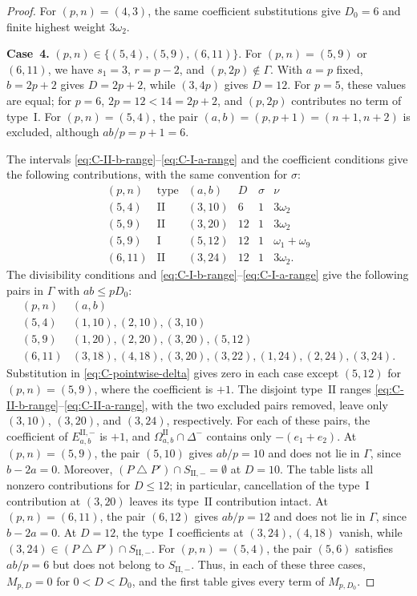 \documentclass[11pt,a4paper]{amsart}
\theoremstyle{plain}
\numberwithin{equation}{section}
\newenvironment{pf}{\begin{proof}}{\end{proof}}
\begin{document}
\begin{pf}
	For \((p,n)=(4,3)\), the same coefficient substitutions give
	\(D_0=6\) and finite highest weight \(3\omega_2\).
	
	\smallskip
	
	\noindent\textbf{Case~4.} \((p,n)\in\{(5,4),(5,9),(6,11)\}\).
	For \((p,n)=(5,9)\) or \((6,11)\), we have \(s_1=3\),
	\(r=p-2\), and \((p,2p)\notin\Gamma\). With \(a=p\) fixed,
	\(b=2p+2\) gives \(D=2p+2\), while \((3,4p)\) gives \(D=12\).
	For \(p=5\), these values are equal; for \(p=6\),
	\(2p=12<14=2p+2\), and \((p,2p)\) contributes no
	term of type~\(\mathrm I\). For \((p,n)=(5,4)\), the pair
	\((a,b)=(p,p+1)=(n+1,n+2)\) is excluded, although
	\(ab/p=p+1=6\).
	
	The intervals \eqref{eq:C-II-b-range}--\eqref{eq:C-I-a-range}
	and the coefficient conditions give the following contributions,
	with the same convention for \(\sigma\):
	\[
	\begin{array}{c|c|c|c|c|l}
		(p,n)&\text{type}&(a,b)&D&\sigma&\nu\\ \hline
		(5,4)&\mathrm{II}&(3,10)&6&1&3\omega_2\\
		(5,9)&\mathrm{II}&(3,20)&12&1&3\omega_2\\
		(5,9)&\mathrm I&(5,12)&12&1&\omega_1+\omega_9\\
		(6,11)&\mathrm{II}&(3,24)&12&1&3\omega_2.
	\end{array}
	\]
	The divisibility conditions and
	\eqref{eq:C-I-b-range}--\eqref{eq:C-I-a-range} give the following
	pairs in \(\Gamma\) with \(ab\le pD_0\):
	\[
	\begin{array}{c|l}
		(p,n)&(a,b)\\ \hline
		(5,4)&(1,10),(2,10),(3,10)\\
		(5,9)&(1,20),(2,20),(3,20),(5,12)\\
		(6,11)&(3,18),(4,18),(3,20),(3,22),(1,24),(2,24),(3,24).
	\end{array}
	\]
	Substitution in \eqref{eq:C-pointwise-delta} gives zero in each
	case except \((5,12)\) for \((p,n)=(5,9)\), where the coefficient
	is \(+1\). The disjoint type~\(\mathrm{II}\) ranges
	\eqref{eq:C-II-b-range}--\eqref{eq:C-II-a-range}, with the two
	excluded pairs removed, leave only \((3,10)\), \((3,20)\), and
	\((3,24)\), respectively. For each of these pairs, the coefficient of
	\(E_{a,b}^{\mathrm{II},-}\) is \(+1\), and
	\(\Omega_{a,b}^{\mathrm{II}}\cap\Delta^-\) contains only
	\(-(e_1+e_2)\).
	At \((p,n)=(5,9)\), the pair \((5,10)\) gives \(ab/p=10\)
	and does not lie in \(\Gamma\), since \(b-2a=0\).
	Moreover, \((P\mathbin\triangle P')\cap S_{\mathrm{II},-}=\emptyset\)
	at \(D=10\). The table lists all nonzero contributions for
	\(D\le12\); in particular, cancellation of the type~\(\mathrm I\)
	contribution at \((3,20)\) leaves its type~\(\mathrm{II}\)
	contribution intact.
	At \((p,n)=(6,11)\), the pair \((6,12)\) gives \(ab/p=12\)
	and does not lie in \(\Gamma\), since \(b-2a=0\).
	At \(D=12\), the type~\(\mathrm I\) coefficients at
	\((3,24),(4,18)\) vanish, while
	\((3,24)\in(P\mathbin\triangle P')\cap S_{\mathrm{II},-}\).
	For \((p,n)=(5,4)\), the pair \((5,6)\) satisfies \(ab/p=6\)
	but does not belong to \(S_{\mathrm{II},-}\). Thus, in each of
	these three cases, \(M_{p,D}=0\) for \(0<D<D_0\), and the
	first table gives every term of \(M_{p,D_0}\).
	

\end{pf}
\end{document}
